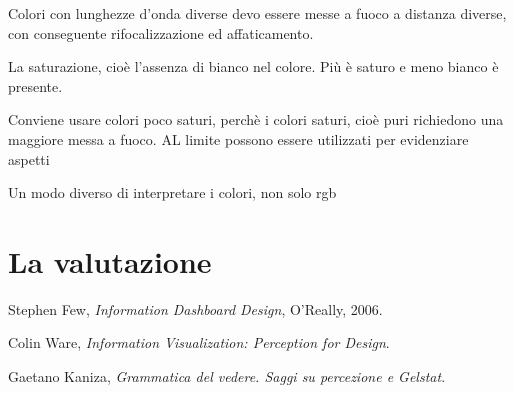 \documentclass{ium}
\begin{document}
Colori con lunghezze d'onda diverse devo essere messe a fuoco a distanza diverse, con conseguente rifocalizzazione ed affaticamento.

La saturazione, cioè l'assenza di bianco nel colore. Più è saturo e meno bianco è presente.

Conviene usare colori poco saturi, perchè i colori saturi, cioè puri richiedono una maggiore messa a fuoco. AL limite possono essere utilizzati per evidenziare aspetti

Un modo diverso di interpretare i colori, non solo rgb



\section{La valutazione}




%
%

\begin{thebibliography}{99}

  {\sc Stephen Few},
  {\em Information Dashboard Design},
  O'Really, 2006.

  {\sc Colin Ware},
  {\em Information Visualization: Perception for Design}.

  {\sc Gaetano Kaniza},
  {\em Grammatica del vedere. Saggi su percezione e Gelstat}.



\end{thebibliography}
\end{document}
